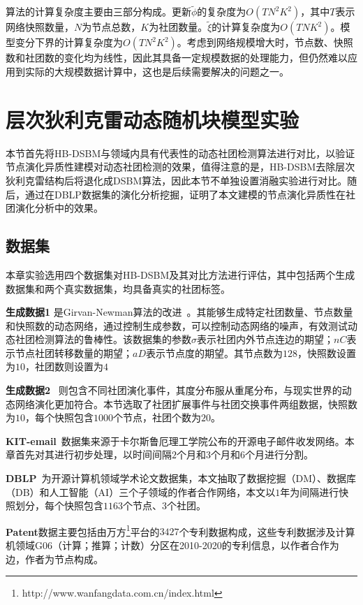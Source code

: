 算法的计算复杂度主要由三部分构成。更新$\widetilde{\phi}$的复杂度为$O(TN^2K^2)$，其中$T$表示网络快照数量，$N$为节点总数，$K$为社团数量。$\widetilde{\xi}$的计算复杂度为$O(TNK^2)$。模型变分下界的计算复杂度为$O(TN^2K^2)$。考虑到网络规模增大时，节点数、快照数和社团数的变化均为线性，因此其具备一定规模数据的处理能力，但仍然难以应用到实际的大规模数据计算中，这也是后续需要解决的问题之一。

\section{层次狄利克雷动态随机块模型实验}


本节首先将HB-DSBM与领域内具有代表性的动态社团检测算法进行对比，以验证节点演化异质性建模对动态社团检测的效果，值得注意的是，HB-DSBM去除层次狄利克雷结构后将退化成DSBM算法，因此本节不单独设置消融实验进行对比。随后，通过在DBLP数据集的演化分析挖掘，证明了本文建模的节点演化异质性在社团演化分析中的效果。


\subsection{数据集}

本章实验选用四个数据集对HB-DSBM及其对比方法进行评估，其中包括两个生成数据集和两个真实数据集，均具备真实的社团标签。

\textbf{生成数据1} 是Girvan-Newman算法的改进~\cite{lin2008facetnet}。其能够生成特定社团数量、节点数量和快照数的动态网络，通过控制生成参数，可以控制动态网络的噪声，有效测试动态社团检测算法的鲁棒性。该数据集的参数$\sigma$表示社团内外节点连边的期望；$nC$表示节点社团转移数量的期望；$aD$表示节点度的期望。其节点数为$128$，快照数设置为$10$，社团数则设置为$4$

\textbf{生成数据2} ~\cite{greene2010tracking}则包含不同社团演化事件，其度分布服从重尾分布，与现实世界的动态网络演化更加符合。本节选取了社团扩展事件与社团交换事件两组数据，快照数为$10$，每个快照包含$1000$个节点，社团个数为$20$。

\textbf{KIT-email}~\cite{gorkedynamic}数据集来源于卡尔斯鲁厄理工学院公布的开源电子邮件收发网络。本章首先对其进行初步处理，以时间间隔$2$个月和$3$个月和$6$个月进行分割。

\textbf{DBLP}~\cite{konect:2017:dblp-cite}为开源计算机领域学术论文数据集，本文抽取了数据挖掘（DM）、数据库（DB）和人工智能（AI）三个子领域的作者合作网络，本文以$1$年为间隔进行快照划分，每个快照包含$1163$个节点、$3$个社团。

\textbf{Patent}数据主要包括由万方\footnote{ http://www.wanfangdata.com.cn/index.html}平台的$3427$个专利数据构成，这些专利数据涉及计算机领域G06（计算；推算；计数）分区在2010-2020的专利信息，以作者合作为边，作者为节点构成。

